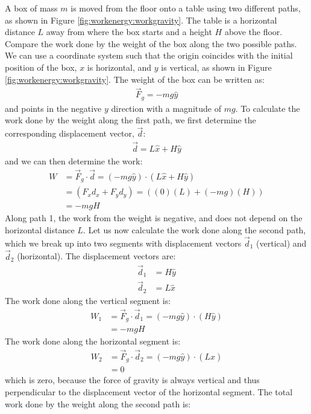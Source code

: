 \begin{example}{
A box of mass $m$ is moved from the floor onto a table using two different paths, as shown in Figure \ref{fig:workenergy:workgravity}. The table is a horizontal distance $L$ away from where the box starts and a height $H$ above the floor. Compare the work done by the weight of the box along the two possible paths.}
We can use a coordinate system such that the origin coincides with the initial position of the box, $x$ is horizontal, and $y$ is vertical, as shown in Figure \ref{fig:workenergy:workgravity}. The weight of the box can be written as:
\begin{align*}
\vec F_g = -mg \hat y
\end{align*}
and points in the negative $y$ direction with a magnitude of $mg$. To calculate the work done by the weight along the first path, we first determine the corresponding displacement vector, $\vec d$:
\begin{align*}
\vec d = L\hat x + H\hat y
\end{align*}
and we can then determine the work:
\begin{align*}
W &= \vec F_g \cdot \vec d = (-mg \hat y) \cdot (L\hat x + H\hat y)\\
&=(F_xd_x+F_yd_y)=( (0)(L) + (-mg)(H))\\
&= -mgH
\end{align*}
Along path 1, the work from the weight is negative, and does not depend on the horizontal distance $L$. Let us now calculate the work done along the second path, which we break up into two segments with displacement vectors $\vec d_1$ (vertical) and $\vec d_2$ (horizontal). The displacement vectors are:
\begin{align*}
\vec d_1 &= H\hat y\\
\vec d_2 &= L\hat x
\end{align*}
The work done along the vertical segment is:
\begin{align*}
W_1 &= \vec F_g \cdot \vec d_1 = (-mg \hat y) \cdot (H\hat y)\\
&=-mgH
\end{align*}
The work done along the horizontal segment is:
\begin{align*}
W_2 &= \vec F_g \cdot \vec d_2 = (-mg \hat y) \cdot (L\hat x)\\
&=0
\end{align*}
which is zero, because the force of gravity is always vertical and thus perpendicular to the displacement vector of the horizontal segment. The total work done by the weight along the second path is:

\end{example}
